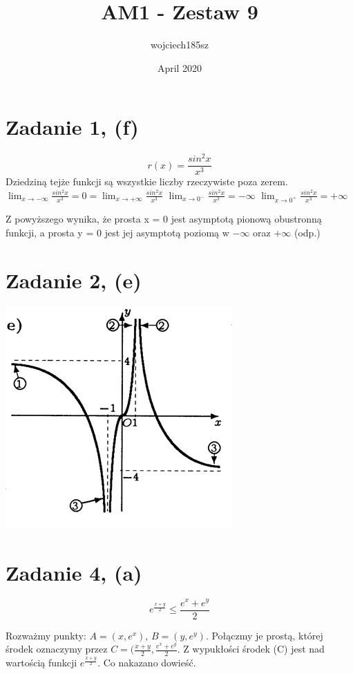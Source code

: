 \documentclass{article}
\title{AM1 - Zestaw 9}
\author{wojciech185sz }
\date{April 2020}
\begin{document}
\maketitle

\section{Zadanie 1, (f)}

$$r(x) = \frac{sin^{2}x}{x^3}$$
Dziedziną tejże funkcji są wszystkie liczby rzeczywiste poza zerem. \newline
$\displaystyle\lim_{x \to -\infty} \frac{sin^{2}x}{x^3} = 0 = \displaystyle\lim_{x \to +\infty}\frac{sin^{2}x}{x^3}$ \newline
$\displaystyle\lim_{x \to 0^-} \frac{sin^{2}x}{x^3} = -\infty $ \newline
$\displaystyle\lim_{x \to 0^+} \frac{sin^{2}x}{x^3} = +\infty $ \newline \newline

Z powyższego wynika, że prosta x = 0 jest asymptotą pionową obustronną funkcji, a prosta y = 0 jest jej asymptotą poziomą w $-\infty$ oraz $+\infty$ (odp.)

\section{Zadanie 2, (e)}
\includegraphics{wykres.png}

\section{Zadanie 4, (a)}

$$e^{\frac{x+y}{2}} \leq \frac{e^{x}+e^{y}}{2}$$

Rozważmy punkty: $A = (x, e^x)$, $B = (y, e^y)$. Połączmy je prostą, której środek oznaczymy przez $C = (\frac{x+y}{2}, \frac{e^{x}+e^{y}}{2}$. Z wypukłości środek (C) jest nad wartością funkcji $e^{\frac{x+y}{2}}$. Co nakazano dowieść.
\end{document}
